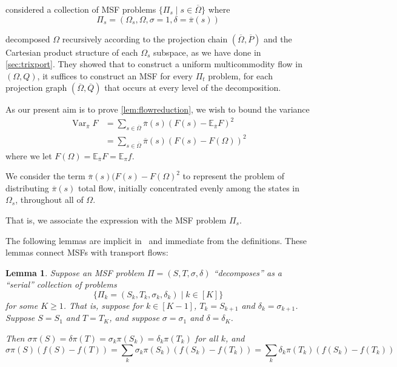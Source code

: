 \documentclass[a4paper, 12p]{article}
\numberwithin{equation}{section}
\newcommand{\Exp}{\mathbb{E}}
\newcommand{\FF}{F}
\newcommand{\Omproj}{\overline{\Omega}}
\newcommand{\piproj}{\overline{\pi}}
\newcommand{\Pproj}{\overline{P}}
\newcommand{\Qproj}{\overline{Q}}
\newcommand{\var}{\operatorname{Var}}
\newtheorem{lemma}[theorem]{Lemma}
\begin{document}
\cite{eppstein2022improved} considered a collection of MSF problems $\{\Pi_s \mid s \in \Omproj\}$ where
\[
    \Pi_s = \left(\Omega_s, \Omega, \sigma = 1, \delta = \piproj(s)\right)
\]

\cite{eppstein2022improved} decomposed $\Omega$ recursively according to the projection chain $(\Omproj, \Pproj)$ and the Cartesian product structure of each $\Omega_s$ subspace, as we have done in \cref{sec:trixport}. They showed that to construct a uniform multicommodity flow in $(\Omega, Q)$, it suffices to construct an MSF for every $\Pi_t$ problem, for each projection graph $(\Omproj, \Qproj)$ that occurs at every level of the decomposition.

As our present aim is to prove \cref{lem:flowreduction}, we wish to bound the variance
\begin{align}
    \var_{\piproj} \FF &= \sum_{s \in \Omproj} \piproj(s)(\FF(s) - \Exp_{\piproj} \FF)^2 \nonumber \\
    &= \sum_{s \in \Omproj} \piproj(s)(\FF(s) - \FF(\Omega))^2 \nonumber
\end{align}
where we let $\FF(\Omega) = \Exp_{\piproj} \FF = \Exp_{\pi} f$.

We consider the term $\piproj(s)(\FF(s) - \FF(\Omega)^2$ to represent the problem of distributing $\piproj(s)$ total flow, initially concentrated evenly among the states in $\Omega_s$, throughout all of $\Omega$. 

That is, we associate the expression with the MSF problem $\Pi_s$.

The following lemmas are implicit in~\cite{eppstein2022improved} and immediate from the definitions. These lemmas connect MSFs with transport flows:

\begin{lemma}
    Suppose an MSF problem $\Pi = (S, T, \sigma, \delta)$ ``decomposes'' as a ``serial'' collection of problems
    \[
        \{\Pi_k = (S_k, T_k, \sigma_k, \delta_k) \mid k \in [K]\}
    \]
    for some $K \geq 1$. That is, suppose for $k \in [K - 1]$, $T_k = S_{k+1}$ and $\delta_k = \sigma_{k+1}$. Suppose $S = S_1$ and $T = T_K$, and suppose $\sigma = \sigma_1$ and $\delta = \delta_K$.
 
    Then
    $\sigma \pi(S) = \delta\pi(T) = \sigma_k \pi(S_k) = \delta_k\pi(T_k)$ for all $k$, and 
    \[
        \sigma \pi(S)(f(S) - f(T)) = \sum_k \sigma_k\pi(S_k)(f(S_k) - f(T_k)) = \sum_k \delta_k\pi(T_k)(f(S_k) - f(T_k))
    \]
\end{lemma}
\end{document}
